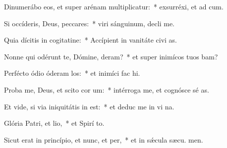 \item Dinumerábo eos, et super arénam multiplicatur:~* exsurréxi, et ad  cum.
\item Si occíderis, Deus, peccares:~* viri sánguinum, decli  me.
\item Quia dícitis in cogitatine:~* Accípient in vanitáte civi as.
\item Nonne qui odérunt te, Dómine, deram?~* et super inimícos tuos bam?
\item Perfécto ódio óderam los:~* et inimíci fac  hi.
\item Proba me, Deus, et scito cor um:~* intérroga me, et cognósce sé as.
\item Et vide, si via iniquitátis in  est:~* et deduc me in vi na.
\item Glória Patri, et lio,~* et Spirí to.
\item Sicut erat in princípio, et nunc, et per,~* et in sǽcula sæcu. men.
